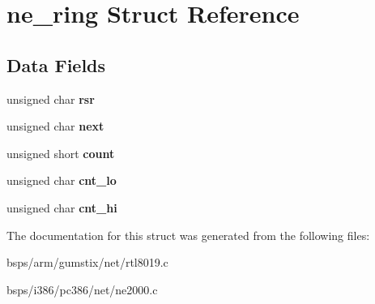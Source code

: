 \hypertarget{structne__ring}{}\section{ne\+\_\+ring Struct Reference}
\label{structne__ring}
\subsection*{Data Fields}
\begin{DoxyCompactItemize}
\item 
\mbox{\label{structne__ring_ac710953b2243a62ec13a6536270f7230}} 
unsigned char {\bfseries rsr}
\item 
\mbox{\label{structne__ring_a68bacad2704106f226c1d3743c52a4e2}} 
unsigned char {\bfseries next}
\item 
\mbox{\label{structne__ring_a9c22ca8b3a4ecf1b5addf34e5cf9b4a0}} 
unsigned short {\bfseries count}
\item 
\mbox{\label{structne__ring_a271635935cdae06a35fbfa89304e4def}} 
unsigned char {\bfseries cnt\+\_\+lo}
\item 
\mbox{\label{structne__ring_a134156e403fd08862295363949bdedf9}} 
unsigned char {\bfseries cnt\+\_\+hi}
\end{DoxyCompactItemize}


The documentation for this struct was generated from the following files\+:\begin{DoxyCompactItemize}
\item 
bsps/arm/gumstix/net/rtl8019.\+c\item 
bsps/i386/pc386/net/ne2000.\+c\end{DoxyCompactItemize}
